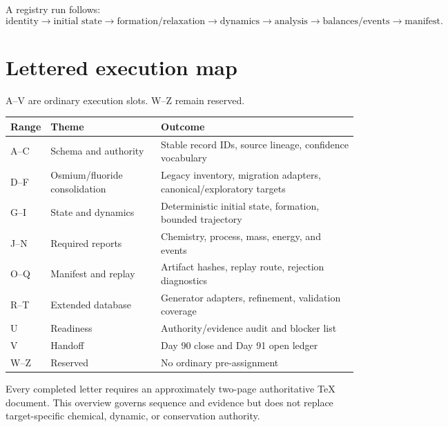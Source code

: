 \documentclass[10pt]{article}
\begin{document}
A registry run follows:
\[
\text{identity}\rightarrow\text{initial state}\rightarrow\text{formation/relaxation}\rightarrow
\text{dynamics}\rightarrow\text{analysis}\rightarrow\text{balances/events}\rightarrow\text{manifest}.
\]

\section*{Lettered execution map}
A--V are ordinary execution slots. W--Z remain reserved.

\begin{center}
\begin{tabularx}{\textwidth}{@{}llX@{}}
\toprule
Range & Theme & Outcome \\
\midrule
A--C & Schema and authority & Stable record IDs, source lineage, confidence vocabulary \\
D--F & Osmium/fluoride consolidation & Legacy inventory, migration adapters, canonical/exploratory targets \\
G--I & State and dynamics & Deterministic initial state, formation, bounded trajectory \\
J--N & Required reports & Chemistry, process, mass, energy, and events \\
O--Q & Manifest and replay & Artifact hashes, replay route, rejection diagnostics \\
R--T & Extended database & Generator adapters, refinement, validation coverage \\
U & Readiness & Authority/evidence audit and blocker list \\
V & Handoff & Day 90 close and Day 91 open ledger \\
W--Z & Reserved & No ordinary pre-assignment \\
\bottomrule
\end{tabularx}
\end{center}

Every completed letter requires an approximately two-page authoritative TeX document. This overview governs sequence and evidence but does not replace target-specific chemical, dynamic, or conservation authority.
\end{document}
